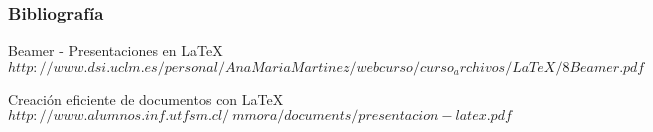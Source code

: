 \documentclass{beamer}
\begin{document}
\begin{frame}

\frametitle{Bibliografía}

\begin{thebibliography}{10}

\beamertemplatebookbibitems
{}Beamer - Presentaciones en LaTeX
 {\tiny $http://www.dsi.uclm.es/personal/AnaMariaMartinez/webcurso/curso_archivos/LaTeX/8Beamer.pdf$}

\beamertemplatebookbibitems
{}Creación eficiente de documentos con LaTeX
 {\tiny $http://www.alumnos.inf.utfsm.cl/~mmora/documents/presentacion-latex.pdf$}

\end{thebibliography}

\end{frame}
\end{document}
